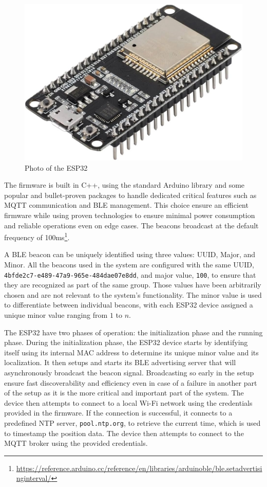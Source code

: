 \begin{figure}
    \centering
    \includegraphics[width=0.5\linewidth]{assets/image-esp32.jpg}
    \caption{Photo of the ESP32}
    \label{fig:esp32}
\end{figure}

The firmware is built in C++, using the standard Arduino library and some popular and bullet-proven packages to handle dedicated critical features such as MQTT communication and BLE management. This choice ensure an efficient firmware while using proven technologies to ensure minimal power consumption and reliable operations even on edge cases. The beacons broadcast at the default frequency of 100ms\footnote{\url{https://reference.arduino.cc/reference/en/libraries/arduinoble/ble.setadvertisinginterval/}}.

A BLE beacon can be uniquely identified using three values: UUID, Major, and Minor. All the beacons used in the system are configured with the same UUID, \texttt{4bfde2c7-e489-47a9-965e-484dae07e8dd}, and major value, \texttt{100}, to ensure that they are recognized as part of the same group. Those values have been arbitrarily chosen and are not relevant to the system's functionality. The minor value is used to differentiate between individual beacons, with each ESP32 device assigned a unique minor value ranging from $1$ to $n$.

The ESP32 have two phases of operation: the initialization phase and the running phase. During the initialization phase, the ESP32 device starts by identifying itself using its internal MAC address to determine its unique minor value and its localization. It then setups and starts its BLE advertising server that will asynchronously broadcast the beacon signal. Broadcasting so early in the setup ensure fast discoverability and efficiency even in case of a failure in another part of the setup as it is the more critical and important part of the system. The device then attempts to connect to a local Wi-Fi network using the credentials provided in the firmware. If the connection is successful, it connects to a predefined NTP server, \texttt{pool.ntp.org}, to retrieve the current time, which is used to timestamp the position data. The device then attempts to connect to the MQTT broker using the provided credentials. 

